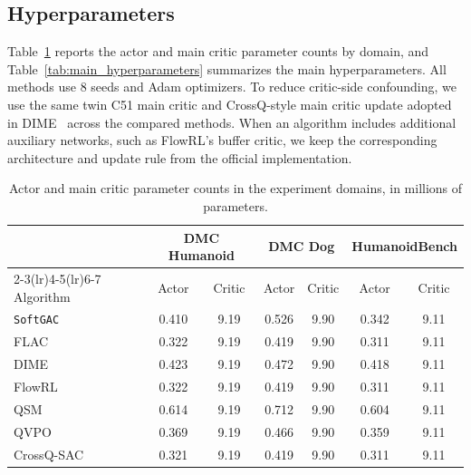 \documentclass[11pt]{article}
\newcommand{\myalgo}{\texttt{SoftGAC}\xspace}
\begin{document}
\subsection{Hyperparameters}
\label{app:hyperparameters}

Table~\ref{tab:actor_parameter_counts_main} reports the actor and main critic parameter counts by domain, and Table~\ref{tab:main_hyperparameters} summarizes the main hyperparameters. All methods use $8$ seeds and Adam optimizers. To reduce critic-side confounding, we use the same twin C51 main critic and CrossQ-style main critic update adopted in DIME~\cite{DIME25} across the compared methods. When an algorithm includes additional auxiliary networks, such as FlowRL's buffer critic, we keep the corresponding architecture and update rule from the official implementation.

\begin{table}[H]
  \centering
  \setlength{\tabcolsep}{4pt}
  \caption{Actor and main critic parameter counts in the experiment domains, in millions of parameters.}
  \label{tab:actor_parameter_counts_main}
  \begin{tabular}{lcccccc}
    \toprule
    & \multicolumn{2}{c}{DMC Humanoid} & \multicolumn{2}{c}{DMC Dog} & \multicolumn{2}{c}{HumanoidBench} \\
    \cmidrule(lr){2-3}\cmidrule(lr){4-5}\cmidrule(lr){6-7}
    Algorithm & Actor & Critic & Actor & Critic & Actor & Critic \\
    \midrule
    \myalgo & 0.410 & 9.19 & 0.526 & 9.90 & 0.342 & 9.11 \\
    FLAC & 0.322 & 9.19 & 0.419 & 9.90 & 0.311 & 9.11 \\
    DIME & 0.423 & 9.19 & 0.472 & 9.90 & 0.418 & 9.11 \\
    FlowRL & 0.322 & 9.19 & 0.419 & 9.90 & 0.311 & 9.11 \\
    QSM & 0.614 & 9.19 & 0.712 & 9.90 & 0.604 & 9.11 \\
    QVPO & 0.369 & 9.19 & 0.466 & 9.90 & 0.359 & 9.11 \\
    CrossQ-SAC & 0.321 & 9.19 & 0.419 & 9.90 & 0.311 & 9.11 \\
    \bottomrule
  \end{tabular}
\end{table}
\end{document}
